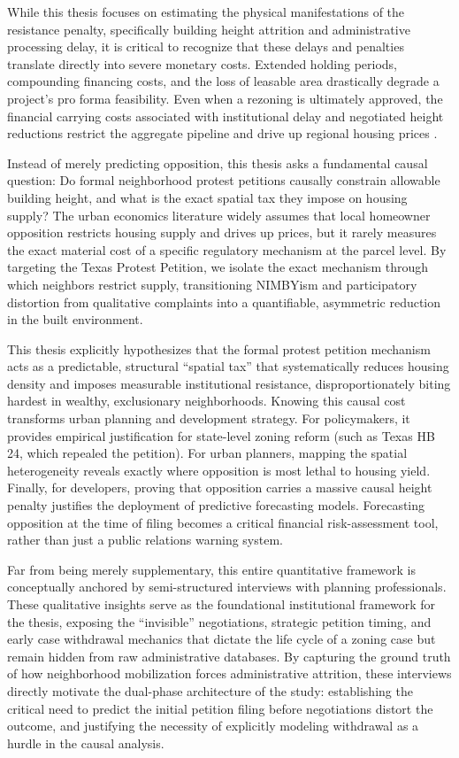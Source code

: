 \documentclass[11pt, letterpaper, oneside]{article}
\begin{document}
While this thesis focuses on estimating the physical manifestations of the resistance penalty, specifically building height attrition and administrative processing delay, it is critical to recognize that these delays and penalties translate directly into severe monetary costs. Extended holding periods, compounding financing costs, and the loss of leasable area drastically degrade a project's pro forma feasibility. Even when a rezoning is ultimately approved, the financial carrying costs associated with institutional delay and negotiated height reductions restrict the aggregate pipeline and drive up regional housing prices \cite{glaeser2003zoning,gyourko2021local}.


Instead of merely predicting opposition, this thesis asks a fundamental causal question: Do formal neighborhood protest petitions causally constrain allowable building height, and what is the exact spatial tax they impose on housing supply? The urban economics literature widely assumes that local homeowner opposition restricts housing supply and drives up prices, but it rarely measures the exact material cost of a specific regulatory mechanism at the parcel level. By targeting the Texas Protest Petition, we isolate the exact mechanism through which neighbors restrict supply, transitioning NIMBYism and participatory distortion from qualitative complaints into a quantifiable, asymmetric reduction in the built environment.

This thesis explicitly hypothesizes that the formal protest petition mechanism acts as a predictable, structural ``spatial tax'' that systematically reduces housing density and imposes measurable institutional resistance, disproportionately biting hardest in wealthy, exclusionary neighborhoods. Knowing this causal cost transforms urban planning and development strategy. For policymakers, it provides empirical justification for state-level zoning reform (such as Texas HB 24, which repealed the petition). For urban planners, mapping the spatial heterogeneity reveals exactly where opposition is most lethal to housing yield. Finally, for developers, proving that opposition carries a massive causal height penalty justifies the deployment of predictive forecasting models. Forecasting opposition at the time of filing becomes a critical financial risk-assessment tool, rather than just a public relations warning system.

Far from being merely supplementary, this entire quantitative framework is conceptually anchored by semi-structured interviews with planning professionals. These qualitative insights serve as the foundational institutional framework for the thesis, exposing the ``invisible'' negotiations, strategic petition timing, and early case withdrawal mechanics that dictate the life cycle of a zoning case but remain hidden from raw administrative databases. By capturing the ground truth of how neighborhood mobilization forces administrative attrition, these interviews directly motivate the dual-phase architecture of the study: establishing the critical need to predict the initial petition filing before negotiations distort the outcome, and justifying the necessity of explicitly modeling withdrawal as a hurdle in the causal analysis.
\end{document}
